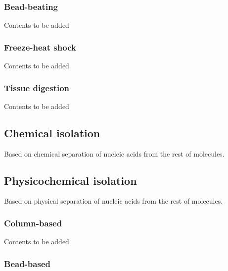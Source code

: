 \documentclass[
]{book}
\begin{document}
\hypertarget{bead-beating}{%
\subsubsection*{Bead-beating}\label{bead-beating}}

Contents to be added

\hypertarget{freeze-heat-shock}{%
\subsubsection*{Freeze-heat shock}\label{freeze-heat-shock}}

Contents to be added

\hypertarget{tissue-digestion}{%
\subsubsection*{Tissue digestion}\label{tissue-digestion}}

Contents to be added

\hypertarget{chemical-isolation}{%
\subsection*{Chemical isolation}\label{chemical-isolation}}

Based on chemical separation of nucleic acids from the rest of molecules.

\hypertarget{physicochemical-isolation}{%
\subsection*{Physicochemical isolation}\label{physicochemical-isolation}}

Based on physical separation of nucleic acids from the rest of molecules.

\hypertarget{column-based}{%
\subsubsection*{Column-based}\label{column-based}}

Contents to be added

\hypertarget{bead-based}{%
\subsubsection*{Bead-based}\label{bead-based}}
\end{document}
